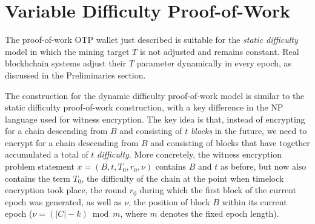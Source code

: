 \section{Variable Difficulty Proof-of-Work}

The proof-of-work OTP wallet just described is suitable for the
\emph{static difficulty}
model in which the mining target $T$ is not adjusted and remains constant.
Real blockhchain systems adjust their $T$ parameter dynamically in every
epoch, as discussed in the Preliminaries section.

The construction for the dynamic difficulty proof-of-work model is similar
to the static difficulty proof-of-work construction, with a key difference
in the \textsc{NP} language used for witness encryption. The key idea is
that, instead of encrypting for a chain descending from $B$ and consisting
of $t$ \emph{blocks} in the future, we need to encrypt for a chain descending
from $B$ and consisting of blocks that have together accumulated a total of $t$
\emph{difficulty}. More concretely, the witness encryption problem statement
$x = (B, t, T_0, r_0, \nu)$ contains $B$ and $t$ as before, but now also contains the
term $T_0$, the difficulty of the chain at the point when timelock encryption
took place, the round $r_0$ during which the first block of the current epoch was
generated, as well as $\nu$, the position of block $B$ within its current epoch
($\nu = (|C| - k) \bmod m$, where $m$ denotes the fixed epoch length).


